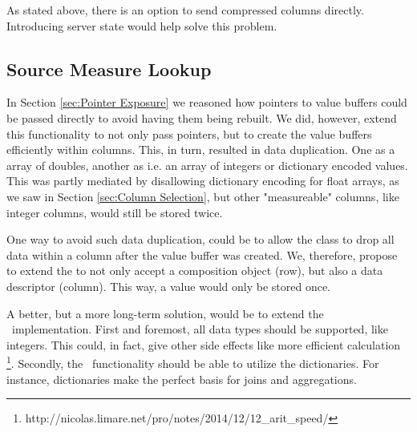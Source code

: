 As stated above, there is an option to send compressed columns directly. Introducing server state would help solve this problem.

\subsection{Source Measure Lookup}
\label{sub:Source Measure Lookup}
In Section \ref{sec:Pointer Exposure} we reasoned how pointers to value buffers could be passed directly to avoid having them being rebuilt. We did, however, extend this functionality to not only pass pointers, but to create the value buffers efficiently within columns. This, in turn, resulted in data duplication. One as a array of doubles, another as i.e. an array of integers or dictionary encoded values. This was partly mediated by disallowing dictionary encoding for float arrays, as we saw in Section \ref{sec:Column Selection}, but other "measureable" columns, like integer columns, would still be stored twice.

One way to avoid such data duplication, could be to allow the  class to drop all data within a column after the value buffer was created. We, therefore, propose to extend the  to not only accept a composition object (row), but also a data descriptor (column). This way, a value would only be stored once.

A better, but a more long-term solution, would be to extend the \bd~implementation. First and foremost, all data types should be supported, like integers. This could, in fact, give other side effects like more efficient calculation \footnote{http://nicolas.limare.net/pro/notes/2014/12/12\_arit\_speed/}. Secondly, the \bd~functionality should be able to utilize the dictionaries. For instance, dictionaries make the perfect basis for joins and aggregations. 


